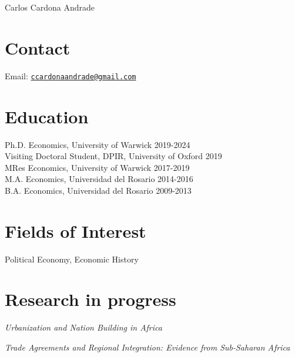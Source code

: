 \documentclass[10pt,letterpaper]{article}
\def\name{Carlos Cardona Andrade}
\renewenvironment{itemize}{
	\begin{list}{}{
			\setlength{\leftmargin}{1.5em}
		}
	}{
	\end{list}
}
\begin{document}
	
	{\huge \name}
	
	
	\vspace{0.25in}
	
	
	\section*{Contact}
	Email: \href{mailto:C.Cardona-Andrade@warwick.ac.uk}{\tt ccardonaandrade@gmail.com}
	
	\section*{Education}
	
	\begin{itemize}
		\item Ph.D. Economics, University of Warwick \hfill 2019-2024\\
		Visiting Doctoral Student, DPIR, University of Oxford \hfill 2019 \\ 
		MRes Economics, University of Warwick \hfill 2017-2019\\
		M.A. Economics, Universidad del Rosario \hfill 2014-2016\\
		B.A. Economics, Universidad del Rosario \hfill 2009-2013
	\end{itemize}
	
	\section*{Fields of Interest}
	\begin{itemize}
		\item Political Economy, Economic History
		
	\end{itemize}
	
	
	
	
	\section*{Research in progress}
	
	
	\begin{itemize}
		\item \emph{Urbanization and Nation Building in Africa} 
		\item \emph{Trade Agreements and Regional Integration: Evidence from Sub-Saharan Africa}
	\end{itemize}
	
\end{document}

